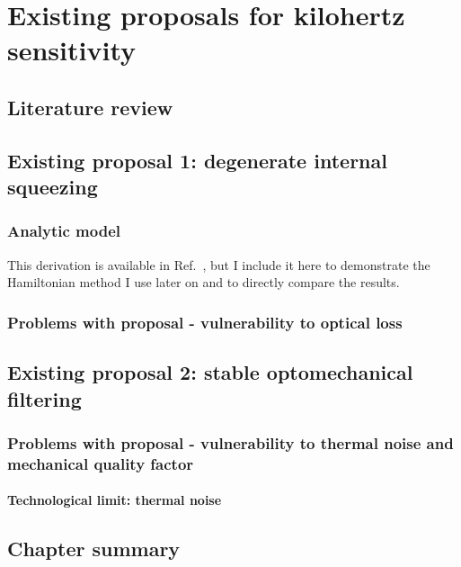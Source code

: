 \chapter{Existing proposals for kilohertz sensitivity}


\section{Literature review}


\section{Existing proposal 1: degenerate internal squeezing}




\subsection{Analytic model}

This derivation is available in Ref.~\cite{}, but I include it here to demonstrate the Hamiltonian method I use later on and to directly compare the results. 



\subsection{Problems with proposal - vulnerability to optical loss}


\section{Existing proposal 2: stable optomechanical filtering}


\subsection{Problems with proposal - vulnerability to thermal noise and mechanical quality factor}


\subsubsection{Technological limit: thermal noise}


\section{Chapter summary}


